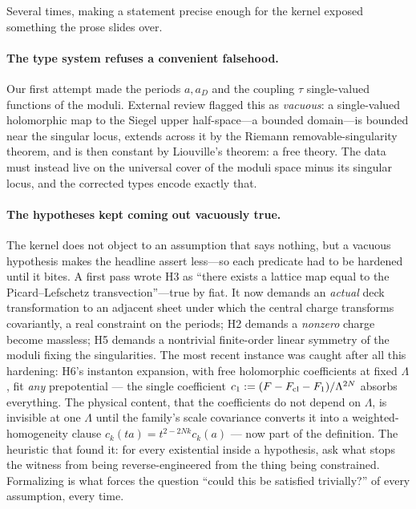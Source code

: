 \documentclass{article}
\theoremstyle{plain}
\theoremstyle{definition}
\numberwithin{equation}{section}
\begin{document}
Several times, making a statement precise enough for
the kernel exposed something the prose slides over.

\paragraph{The type system refuses a convenient falsehood.} Our first attempt made the periods
$a, a_D$ and the coupling $\tau$ single-valued functions of the moduli. External review flagged this
as \emph{vacuous}: a single-valued holomorphic map to the Siegel upper half-space---a bounded
domain---is bounded near the singular locus, extends across it by the Riemann removable-singularity
theorem, and is then constant by Liouville's theorem: a free theory. The data must instead live on the universal cover
of the moduli space minus its singular locus, and the corrected types encode exactly that.

\paragraph{The hypotheses kept coming out vacuously true.} The kernel does not object to an
assumption that says nothing, but a vacuous hypothesis makes the headline assert less---so each
predicate had to be hardened until it bites. A first pass wrote H3 as ``there exists a lattice map
equal to the Picard--Lefschetz transvection''---true by fiat. It now demands an \emph{actual} deck
transformation to an adjacent sheet under which the central charge transforms covariantly, a real
constraint on the periods; H2 demands a \emph{nonzero} charge become massless; H5 demands a
nontrivial finite-order linear symmetry of the moduli fixing the singularities. The most recent
instance was caught after all this hardening: H6's instanton expansion, with free holomorphic
coefficients at fixed $\Lambda$, fit \emph{any} prepotential --- the single coefficient
$c_1 := (F - F_{\rm cl} - F_1)/\Lambda^{2N}$ absorbs everything. The physical content, that the
coefficients do not depend on $\Lambda$, is invisible at one $\Lambda$ until the family's scale
covariance converts it into a weighted-homogeneity clause $c_k(ta) = t^{2-2Nk}c_k(a)$ --- now part
of the definition. The heuristic that found it: for every existential inside a hypothesis, ask
what stops the witness from being reverse-engineered from the thing being constrained.
Formalizing is what
forces the question ``could this be satisfied trivially?'' of every assumption, every time.
\end{document}
